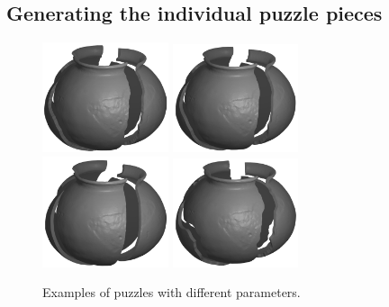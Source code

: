\documentclass[acmlarge,screen,dvipsnames]{acmart}
\begin{document}
\subsection{Generating the individual puzzle pieces}
\label{sec:fragment-generation}

\begin{figure}[H]    
     \centering
         {\includegraphics[width=0.33\textwidth]{images/pott1}}
        {\includegraphics[width=0.33\textwidth]{images/pott2}}
        {\includegraphics[width=0.33\textwidth]{images/pott3}}
        {\includegraphics[width=0.33\textwidth]{images/pott5}}
      \caption{\label{fig:pot-with-different-fracture-settings}%
        Examples of puzzles with different parameters.}
\end{figure}
\end{document}
